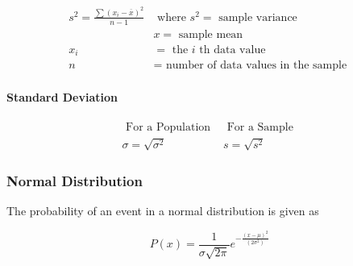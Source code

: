 \begin{equation}
	\begin{aligned} s^{2}=\frac{{\sum\left(x_{i}-\overline{x}\right)}^{2}}{n-1} & \text { where } s^{2}=\text { sample variance } \\ & x=\text { sample mean } \\ x_{i} &=\text { the } i \text { th data value } \\ n &=\text { number of data values in the sample } \end{aligned}
\end{equation}

\paragraph*{Standard Deviation}

\begin{equation}
	\begin{array}{ll}{\text { For a Population }} & {\text { For a Sample }} \\ {\sigma=\sqrt{\sigma^{2}}} & {s=\sqrt{s^{2}}}\end{array}
\end{equation}

\subsubsection{Normal Distribution}
The probability of an event in a normal distribution is given as

\begin{equation}
	P(x)=\frac{1}{\sigma \sqrt{2 \pi}} e^{-\frac{{(x-\mu)}^{2} }{\left(2 \sigma^{2}\right)}}
\end{equation}


